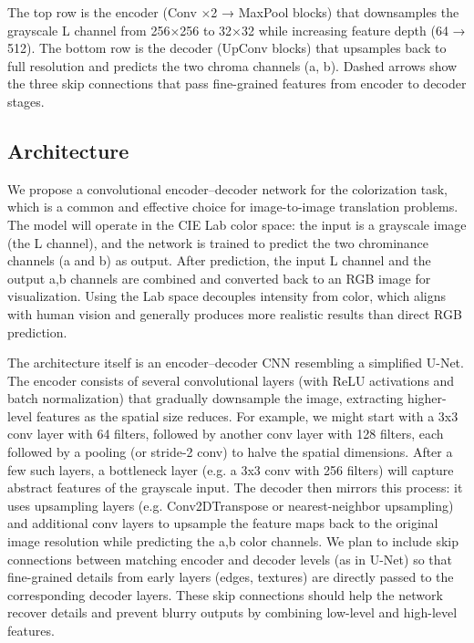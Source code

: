 \documentclass{article} %
\begin{document}
The top row is the encoder (Conv ×2 → MaxPool blocks) that downsamples the grayscale L channel from 256×256 to 32×32 while increasing feature depth (64 → 512).
The bottom row is the decoder (UpConv blocks) that upsamples back to full resolution and predicts the two chroma channels (a, b). Dashed arrows show the three skip connections that pass fine-grained features from encoder to decoder stages.

\subsection{Architecture}

We propose a convolutional encoder–decoder network for the colorization task, which is a common and effective choice for image-to-image translation problems. \cite{leatvanich2025image} The model will operate in the CIE Lab color space: the input is a grayscale image (the L channel), and the network is trained to predict the two chrominance channels (a and b) as output. After prediction, the input L channel and the output a,b channels are combined and converted back to an RGB image for visualization. Using the Lab space decouples intensity from color, which aligns with human vision and generally produces more realistic results than direct RGB prediction. \cite{leatvanich2025image}

The architecture itself is an encoder–decoder CNN resembling a simplified U-Net. The encoder consists of several convolutional layers (with ReLU activations and batch normalization) that gradually downsample the image, extracting higher-level features as the spatial size reduces. For example, we might start with a 3x3 conv layer with 64 filters, followed by another conv layer with 128 filters, each followed by a pooling (or stride-2 conv) to halve the spatial dimensions. After a few such layers, a bottleneck layer (e.g. a 3x3 conv with 256 filters) will capture abstract features of the grayscale input. The decoder then mirrors this process: it uses upsampling layers (e.g. Conv2DTranspose or nearest-neighbor upsampling) and additional conv layers to upsample the feature maps back to the original image resolution while predicting the a,b color channels. We plan to include skip connections between matching encoder and decoder levels (as in U-Net) so that fine-grained details from early layers (edges, textures) are directly passed to the corresponding decoder layers. These skip connections should help the network recover details and prevent blurry outputs by combining low-level and high-level features. \cite{leatvanich2025image}
\end{document}
